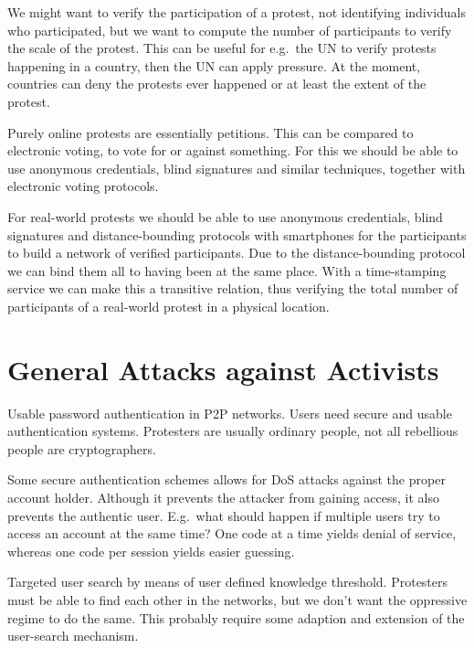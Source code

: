 \documentclass[a4paper]{llncs}
\begin{document}
We might want to verify the participation of a protest, not identifying 
individuals who participated, but we want to compute the number of participants 
to verify the scale of the protest.
This can be useful for e.g.\ the UN to verify protests happening in a country, 
then the UN can apply pressure.
At the moment, countries can deny the protests ever happened or at least the 
extent of the protest.

Purely online protests are essentially petitions.
This can be compared to electronic voting, to vote for or against something.
For this we should be able to use anonymous credentials, blind signatures and 
similar techniques, together with electronic voting protocols.

For real-world protests we should be able to use anonymous credentials, blind 
signatures and distance-bounding protocols with smartphones for the 
participants to build a network of verified participants.
Due to the distance-bounding protocol we can bind them all to having been at 
the same place.
With a time-stamping service we can make this a transitive relation, thus 
verifying the total number of participants of a real-world protest in 
a physical location.


\section{General Attacks against Activists}

Usable password authentication in \ac{P2P} networks.
Users need secure and usable authentication systems.
Protesters are usually ordinary people, not all rebellious people are 
cryptographers.

Some secure authentication schemes allows for \ac{DoS} attacks against the 
proper account holder.
Although it prevents the attacker from gaining access, it also prevents the 
authentic user.
E.g.\ what should happen if multiple users try to access an account at the same 
time?
One code at a time yields denial of service, whereas one code per session 
yields easier guessing.

Targeted user search by means of user defined knowledge threshold.
Protesters must be able to find each other in the networks, but we don't want 
the oppressive regime to do the same.
This probably require some adaption and extension of the user-search mechanism.


\printbibliography{}
\end{document}

